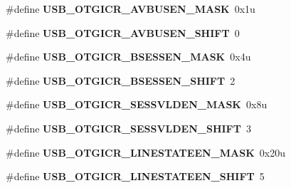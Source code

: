 \begin{DoxyCompactItemize}
\item 
\#define {\bfseries U\+S\+B\+\_\+\+O\+T\+G\+I\+C\+R\+\_\+\+A\+V\+B\+U\+S\+E\+N\+\_\+\+M\+A\+SK}~0x1u\hypertarget{group__USB__Register__Masks_ga7754d512762167f81175b40ed5243050}{}\label{group__USB__Register__Masks_ga7754d512762167f81175b40ed5243050}

\item 
\#define {\bfseries U\+S\+B\+\_\+\+O\+T\+G\+I\+C\+R\+\_\+\+A\+V\+B\+U\+S\+E\+N\+\_\+\+S\+H\+I\+FT}~0\hypertarget{group__USB__Register__Masks_gac9ca8070fe9426a83bc59be69471edd3}{}\label{group__USB__Register__Masks_gac9ca8070fe9426a83bc59be69471edd3}

\item 
\#define {\bfseries U\+S\+B\+\_\+\+O\+T\+G\+I\+C\+R\+\_\+\+B\+S\+E\+S\+S\+E\+N\+\_\+\+M\+A\+SK}~0x4u\hypertarget{group__USB__Register__Masks_ga509dfbaf7a85ddbd9b7b61a1d5032cf1}{}\label{group__USB__Register__Masks_ga509dfbaf7a85ddbd9b7b61a1d5032cf1}

\item 
\#define {\bfseries U\+S\+B\+\_\+\+O\+T\+G\+I\+C\+R\+\_\+\+B\+S\+E\+S\+S\+E\+N\+\_\+\+S\+H\+I\+FT}~2\hypertarget{group__USB__Register__Masks_gad6d45208ed6411e439be457224176789}{}\label{group__USB__Register__Masks_gad6d45208ed6411e439be457224176789}

\item 
\#define {\bfseries U\+S\+B\+\_\+\+O\+T\+G\+I\+C\+R\+\_\+\+S\+E\+S\+S\+V\+L\+D\+E\+N\+\_\+\+M\+A\+SK}~0x8u\hypertarget{group__USB__Register__Masks_ga35e32e6ed718719eb90a5aa7b8af10f3}{}\label{group__USB__Register__Masks_ga35e32e6ed718719eb90a5aa7b8af10f3}

\item 
\#define {\bfseries U\+S\+B\+\_\+\+O\+T\+G\+I\+C\+R\+\_\+\+S\+E\+S\+S\+V\+L\+D\+E\+N\+\_\+\+S\+H\+I\+FT}~3\hypertarget{group__USB__Register__Masks_ga6f1a0dd83404b56be4be006b113f68d8}{}\label{group__USB__Register__Masks_ga6f1a0dd83404b56be4be006b113f68d8}

\item 
\#define {\bfseries U\+S\+B\+\_\+\+O\+T\+G\+I\+C\+R\+\_\+\+L\+I\+N\+E\+S\+T\+A\+T\+E\+E\+N\+\_\+\+M\+A\+SK}~0x20u\hypertarget{group__USB__Register__Masks_gac9d12e9bdf0d60b52ea0b99c668630af}{}\label{group__USB__Register__Masks_gac9d12e9bdf0d60b52ea0b99c668630af}

\item 
\#define {\bfseries U\+S\+B\+\_\+\+O\+T\+G\+I\+C\+R\+\_\+\+L\+I\+N\+E\+S\+T\+A\+T\+E\+E\+N\+\_\+\+S\+H\+I\+FT}~5\hypertarget{group__USB__Register__Masks_ga1824eae0010a884c2b3bd425cfa2b389}{}\label{group__USB__Register__Masks_ga1824eae0010a884c2b3bd425cfa2b389}


\end{DoxyCompactItemize}
